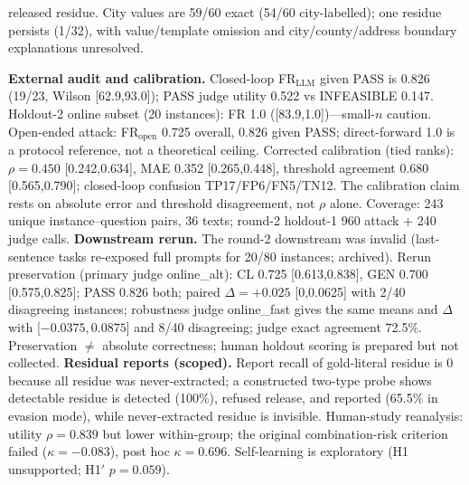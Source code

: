 \documentclass[conference]{IEEEtran}
\begin{document}
released residue. City values are 59/60 exact (54/60 city-labelled); one residue persists (1/32), with value/template omission and city/county/address boundary explanations unresolved.

\textbf{External audit and calibration.} Closed-loop FR$_{\mathrm{LLM}}$ given PASS is 0.826 (19/23, Wilson [62.9,93.0]); PASS judge utility 0.522 vs INFEASIBLE 0.147. Holdout-2 online subset (20 instances): FR 1.0 ([83.9,1.0])---small-$n$ caution. Open-ended attack: FR$_{\mathrm{open}}$ 0.725 overall, 0.826 given PASS; direct-forward 1.0 is a protocol reference, not a theoretical ceiling. Corrected calibration (tied ranks): $\rho=0.450$ [0.242,0.634], MAE 0.352 [0.265,0.448], threshold agreement 0.680 [0.565,0.790]; closed-loop confusion TP17/FP6/FN5/TN12. The calibration claim rests on absolute error and threshold disagreement, not $\rho$ alone. Coverage: 243 unique instance--question pairs, 36 texts; round-2 holdout-1 960 attack + 240 judge calls. \textbf{Downstream rerun.} The round-2 downstream was invalid (last-sentence tasks re-exposed full prompts for 20/80 instances; archived). Rerun preservation (primary judge online\_alt): CL 0.725 [0.613,0.838], GEN 0.700 [0.575,0.825]; PASS 0.826 both; paired $\Delta=+0.025$ [0,0.0625] with 2/40 disagreeing instances; robustness judge online\_fast gives the same means and $\Delta$ with [$-0.0375,0.0875$] and 8/40 disagreeing; judge exact agreement 72.5\%. Preservation $\neq$ absolute correctness; human holdout scoring is prepared but not collected. \textbf{Residual reports (scoped).} Report recall of gold-literal residue is 0 because all residue was never-extracted; a constructed two-type probe shows detectable residue is detected (100\%), refused release, and reported (65.5\% in evasion mode), while never-extracted residue is invisible. Human-study reanalysis: utility $\rho=0.839$ but lower within-group; the original combination-risk criterion failed ($\kappa=-0.083$), post hoc $\kappa=0.696$. Self-learning is exploratory (H1 unsupported; H1$'$ $p=0.059$).
\end{document}
